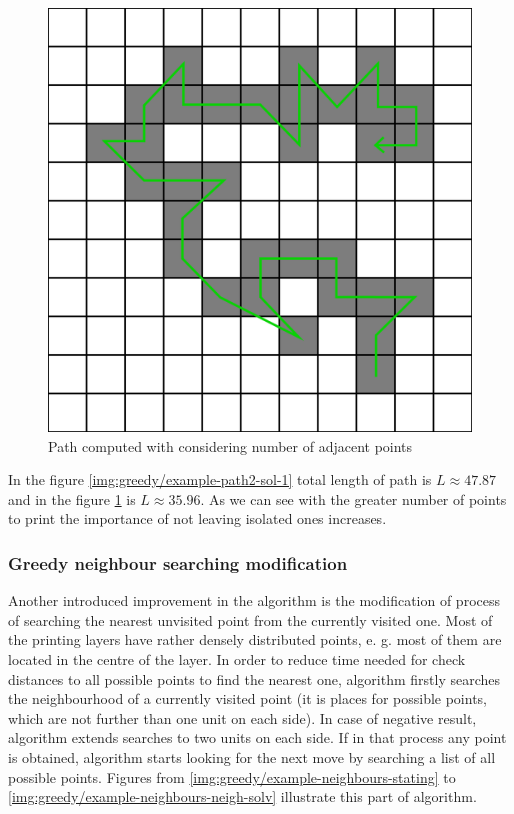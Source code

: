 \documentclass[titlepage]{article}
\newcommand{\multifigcaption}{\captionsetup{justification=justified}}
\begin{document}
\begin{figure}[H]
\begin{center}
\begin{minipage}{.45\linewidth}
 			\includegraphics[width=\textwidth]{img/greedy/example-path2-sol-2.png}
			\multifigcaption
 			\caption{Path computed with considering number of adjacent points \newline \vspace{4mm}}
 			\label{img:greedy/example-path2-sol-2}

 		\end{minipage}
 	\end{center}
 \end{figure}
 
 In the figure \ref{img:greedy/example-path2-sol-1} total length of path is $L \approx 47.87$ and in the figure \ref{img:greedy/example-path2-sol-2} is $L \approx 35.96$. As we can see with the greater number of points to print the importance of not leaving isolated ones increases.
 
\subsubsection{Greedy neighbour searching modification}
 
 Another introduced improvement in the algorithm is the modification of process of searching the nearest unvisited point from the currently visited one. Most of the printing layers have rather densely distributed points, e. g. most of them are located in the centre of the layer. In order to reduce time needed for check distances to all possible points to find the nearest one, algorithm firstly searches the neighbourhood of a currently visited point (it is places for possible points, which are not further than one unit on each side). In case of negative result, algorithm extends searches to two units on each side. If in that process any point is obtained, algorithm starts looking for the next move by searching a list of all possible points. Figures from \ref{img:greedy/example-neighbours-stating} to \ref{img:greedy/example-neighbours-neigh-solv} illustrate this part of algorithm.
 
\end{document}
